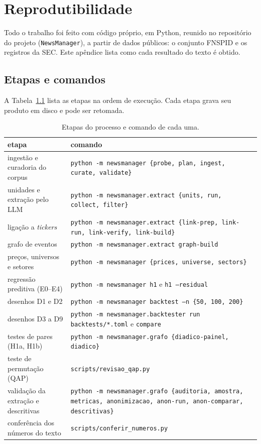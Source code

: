 \chapter{Reprodutibilidade}
\label{ap:reprodutibilidade}

Todo o trabalho foi feito com código próprio, em Python, reunido no repositório do projeto
(\texttt{NewsManager}), a partir de dados públicos: o conjunto FNSPID \citep{dong2024fnspid} e os registros
da SEC. Este apêndice lista como cada resultado do texto é obtido.

\section{Etapas e comandos}

A Tabela~\ref{tab:comandos} lista as etapas na ordem de execução. Cada etapa grava seu produto em disco e
pode ser retomada.

\begin{table}[htbp]
\centering
\small
\caption{Etapas do processo e comando de cada uma.}
\label{tab:comandos}
\begin{tabularx}{\textwidth}{>{\raggedright\arraybackslash}p{4.0cm}>{\raggedright\arraybackslash}X}
\toprule
etapa & comando \\
\midrule
ingestão e curadoria do corpus & \texttt{python -m newsmanager \{probe, plan, ingest, curate, validate\}} \\
unidades e extração pelo LLM & \texttt{python -m newsmanager.extract \{units, run, collect, filter\}} \\
ligação a \emph{tickers} & \texttt{python -m newsmanager.extract \{link-prep, link-run, link-verify, link-build\}} \\
grafo de eventos & \texttt{python -m newsmanager.extract graph-build} \\
preços, universos e setores & \texttt{python -m newsmanager \{prices, universe, sectors\}} \\
regressão preditiva (E0--E4) & \texttt{python -m newsmanager h1} e \texttt{h1 --residual} \\
desenhos D1 e D2 & \texttt{python -m newsmanager backtest --n \{50, 100, 200\}} \\
desenhos D3 a D9 & \texttt{python -m newsmanager.backtester run backtests/*.toml} e \texttt{compare} \\
testes de pares (H1a, H1b) & \texttt{python -m newsmanager.grafo \{diadico-painel, diadico\}} \\
teste de permutação (QAP) & \texttt{scripts/revisao\_qap.py} \\
validação da extração e descritivas & \texttt{python -m newsmanager.grafo \{auditoria, amostra, metricas, anonimizacao, anon-run, anon-comparar, descritivas\}} \\
conferência dos números do texto & \texttt{scripts/conferir\_numeros.py} \\
\bottomrule
\end{tabularx}
\end{table}


